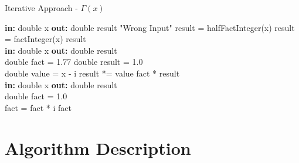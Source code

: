 \documentclass[12pt]{article}
\begin{document}
    \newpage
    \begin{algorithm}
    \caption{Iterative Approach - $\Gamma(x)$ }
    \begin{algorithmic}
        \State \textbf{in: } double x
        \State \textbf{out: } double result
            \Return "Wrong Input"
        \Else {}
         \State result = halfFactInteger(x)
            \Else
            \State result = factInteger(x)
            \EndIf
        \State
        \Return result
        \EndIf
    \EndProcedure
    \\
    \State \textbf{in: } double x
    \State \textbf{out: } double result
    \\
    \State double fact = 1.77
    \State double result = 1.0
    \\
        \State double value = x - i
        \State result *= value
    \EndFor
    \Return fact * result
    \EndProcedure
    \\
    \State \textbf{in: } double x
    \State \textbf{out: } double result
    \\
    \State double fact = 1.0
    \\
        \State fact = fact * i
    \EndFor
    \Return fact
    \EndProcedure
    \\
    \end{algorithmic}
    \end{algorithm}

    \section{Algorithm Description}
\end{document}
